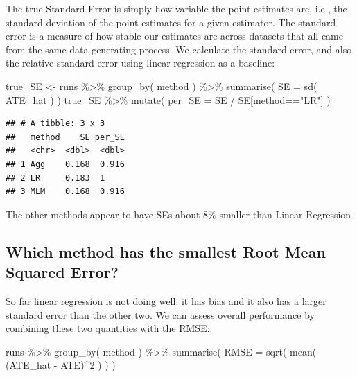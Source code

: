 \documentclass[
]{book}
\newenvironment{Shaded}{\begin{snugshade}}{\end{snugshade}}
\newcommand{\AttributeTok}[1]{\textcolor[rgb]{0.77,0.63,0.00}{#1}}
\newcommand{\DecValTok}[1]{\textcolor[rgb]{0.00,0.00,0.81}{#1}}
\newcommand{\FunctionTok}[1]{\textcolor[rgb]{0.00,0.00,0.00}{#1}}
\newcommand{\NormalTok}[1]{#1}
\newcommand{\OtherTok}[1]{\textcolor[rgb]{0.56,0.35,0.01}{#1}}
\newcommand{\SpecialCharTok}[1]{\textcolor[rgb]{0.00,0.00,0.00}{#1}}
\newcommand{\StringTok}[1]{\textcolor[rgb]{0.31,0.60,0.02}{#1}}
\begin{document}
The true Standard Error is simply how variable the point estimates are, i.e., the standard deviation of the point estimates for a given estimator.
The standard error is a measure of how stable our estimates are across datasets that all came from the same data generating process.
We calculate the standard error, and also the relative standard error using linear regression as a baseline:

\begin{Shaded}
\begin{Highlighting}[]
\NormalTok{true\_SE }\OtherTok{\textless{}{-}}\NormalTok{ runs }\SpecialCharTok{\%\textgreater{}\%} 
  \FunctionTok{group\_by}\NormalTok{( method ) }\SpecialCharTok{\%\textgreater{}\%}
  \FunctionTok{summarise}\NormalTok{( }
    \AttributeTok{SE =} \FunctionTok{sd}\NormalTok{( ATE\_hat )}
\NormalTok{  )}
\NormalTok{true\_SE }\SpecialCharTok{\%\textgreater{}\%}
  \FunctionTok{mutate}\NormalTok{( }\AttributeTok{per\_SE =}\NormalTok{ SE }\SpecialCharTok{/}\NormalTok{ SE[method}\SpecialCharTok{==}\StringTok{"LR"}\NormalTok{] )}
\end{Highlighting}
\end{Shaded}

\begin{verbatim}
## # A tibble: 3 x 3
##   method    SE per_SE
##   <chr>  <dbl>  <dbl>
## 1 Agg    0.168  0.916
## 2 LR     0.183  1    
## 3 MLM    0.168  0.916
\end{verbatim}

The other methods appear to have SEs about 8\% smaller than Linear Regression

\hypertarget{which-method-has-the-smallest-root-mean-squared-error}{%
\subsection{Which method has the smallest Root Mean Squared Error?}\label{which-method-has-the-smallest-root-mean-squared-error}}

So far linear regression is not doing well: it has bias and it also has a larger standard error than the other two.
We can assess overall performance by combining these two quantities with the RMSE:

\begin{Shaded}
\begin{Highlighting}[]
\NormalTok{runs }\SpecialCharTok{\%\textgreater{}\%} 
  \FunctionTok{group\_by}\NormalTok{( method ) }\SpecialCharTok{\%\textgreater{}\%}
  \FunctionTok{summarise}\NormalTok{( }
    \AttributeTok{RMSE =} \FunctionTok{sqrt}\NormalTok{( }\FunctionTok{mean}\NormalTok{( (ATE\_hat }\SpecialCharTok{{-}}\NormalTok{ ATE)}\SpecialCharTok{\^{}}\DecValTok{2}\NormalTok{ ) )}
\NormalTok{  )}
\end{Highlighting}
\end{Shaded}
\end{document}
